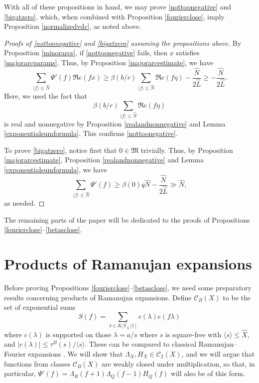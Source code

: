 \documentclass{article}
\theoremstyle{definition}
\theoremstyle{definition}
\theoremstyle{remark}
\newcommand{\F}{\mathbb{F}_q[t]}
\newcommand{\1}{\mathbf{1}}
\numberwithin{equation}{section}
\begin{document}
With all of these propositions in hand, we may prove \eqref{nottoonegative} and \eqref{bigatzero}, which, when combined with Proposition \ref{fourierclose}, imply Proposition \ref{normalizedvdc}, as noted above. 


\begin{proof}[Proofs of \eqref{nottoonegative} and \eqref{bigatzero} assuming the propositions above]


By Proposition \ref{minorarcs}, if \eqref{nottoonegative} fails, then $x$ satisfies \eqref{majorarcparams}. Thus, by Proposition \ref{majorarcestimate}, we have 
\[\sum_{\langle f\rangle \leq \widehat{N}} \Psi'(f)\Re e(fx) \geq \beta(b\slash r) \sum_{\langle f \rangle \leq \widehat{N}}\Re e(f\eta)-\frac{\widehat{N}}{2\widehat{L}}\geq -\frac{\widehat{N}}{2\widehat{L}}.\]
Here, we used the fact that 
\[\beta(b\slash r) \sum_{\langle f \rangle \leq \widehat{N}}\Re e(f\eta)\]
is real and nonnegative by Proposition \ref{realandnonnegative} and Lemma \ref{exponentialsumformula}. This confirms \eqref{nottoonegative}. 

To prove \eqref{bigatzero}, notice first that $0\in\mathfrak{M}$ trivially. Thus, by Proposition \ref{majorarcestimate}, Proposition \ref{realandnonnegative} and Lemma \ref{exponentialsumformula}, we have  
\[\sum_{\langle f\rangle \leq \widehat{N}} \Psi'(f) \geq \beta(0) q\widehat{N}-\frac{\widehat{N}}{2\widehat{L}}\gg \widehat{N},\]
as needed. 
\end{proof}

The remaining parts of the paper will be dedicated to the proofs of Propositions \ref{fourierclose}--\ref{betasclose}.

\section{Products of Ramanujan expansions}
Before proving Propositions \ref{fourierclose}--\ref{betasclose}, we need some preparatory results concerning products of Ramanujan expansions. Define $\mathcal{C}_B(X)$ to be the set of exponential sums 
\[S(f)=\sum_{\lambda\in K\slash \F}c(\lambda)e(f\lambda)\]
where $c(\lambda)$ is supported on those $\lambda= a\slash s$ where $s$ is square-free with $\langle s \rangle \leq \widehat{X}$, and $|c(\lambda)|\leq \tau^B(s)\slash \langle s\rangle $. These can be compared to classical Ramanujan--Fourier expansions \cite{Ramanujan1918}. We will show that $\Lambda_X, H_X\in \mathcal{C}_2(X)$, and we will argue that functions from classes $\mathcal{C}_B(X)$ are weakly closed under multiplication, so that, in particular, $\Psi'(f)=\Lambda_R(f+1)\Lambda_Q(f-1)H_Q(f)$ will also be of this form. 
\end{document}
